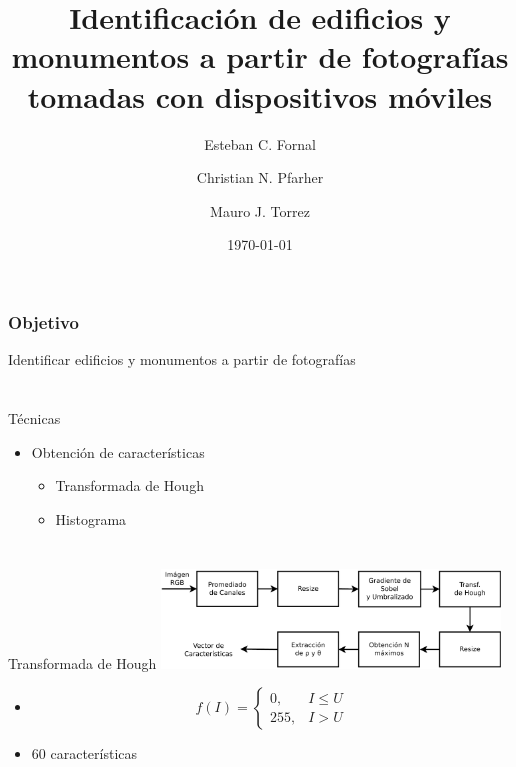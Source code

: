 \documentclass[spanish]{beamer}
\title{Identificación de edificios y monumentos a partir de fotografías tomadas 
con dispositivos móviles}
\author{Esteban C. Fornal \and Christian N. Pfarher \and Mauro J. Torrez}
\date{\today}
\begin{document}
%
\frame{\titlepage}

\section[Objetivo]{}

\begin{frame}{}
\frametitle{Objetivo}
Identificar edificios y monumentos a partir de fotografías
\end{frame}

\section[Herramientas]{}

\begin{frame}{Técnicas}
\begin{itemize}
\item Obtención de características
\begin{itemize}
\item<1-> Transformada de Hough
\item<2-> Histograma
\end{itemize}
\end{itemize}
\end{frame}

\section[Técnicas]{}

\begin{frame}{Transformada de Hough}
  \includegraphics[width=9cm]{../diagramas/procesohough}

  \begin{itemize}
  \item[]
    \begin{equation*}
      \label{umbral}
      f(I)=
      \begin{cases}
      0, & I\leq U\\
      255, & I > U
      \end{cases}
      \end{equation*}
  \item 60 características
  \end{itemize}
\end{frame}
\end{document}
